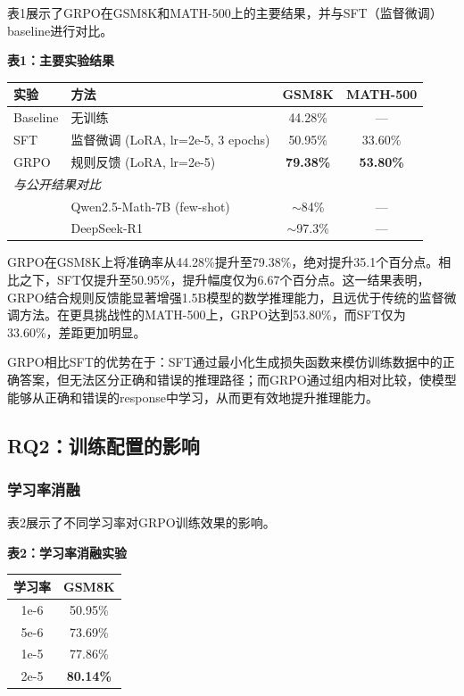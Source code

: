 \documentclass[10.5pt]{article}
\begin{document}
表1展示了GRPO在GSM8K和MATH-500上的主要结果，并与SFT（监督微调）baseline进行对比。

\begin{center}
\textbf{表1：主要实验结果}
\end{center}

\begin{center}
\begin{tabular}{llcc}
\hline
\textbf{实验} & \textbf{方法} & \textbf{GSM8K} & \textbf{MATH-500} \\
\hline
Baseline & 无训练 & 44.28\% & --- \\
SFT & 监督微调 (LoRA, lr=2e-5, 3 epochs) & 50.95\% & 33.60\% \\
GRPO & 规则反馈 (LoRA, lr=2e-5) & \textbf{79.38\%} & \textbf{53.80\%} \\
\hline
\multicolumn{4}{l}{\textit{与公开结果对比}} \\
\hline
\cite{qwen25math} & Qwen2.5-Math-7B (few-shot) & $\sim$84\% & --- \\
\cite{deepseekr1} & DeepSeek-R1 & $\sim$97.3\% & --- \\
\hline
\end{tabular}
\end{center}

GRPO在GSM8K上将准确率从44.28\%提升至79.38\%，绝对提升35.1个百分点。相比之下，SFT仅提升至50.95\%，提升幅度仅为6.67个百分点。这一结果表明，GRPO结合规则反馈能显著增强1.5B模型的数学推理能力，且远优于传统的监督微调方法。在更具挑战性的MATH-500上，GRPO达到53.80\%，而SFT仅为33.60\%，差距更加明显。

GRPO相比SFT的优势在于：SFT通过最小化生成损失函数来模仿训练数据中的正确答案，但无法区分正确和错误的推理路径；而GRPO通过组内相对比较，使模型能够从正确和错误的response中学习，从而更有效地提升推理能力。

\subsection{RQ2：训练配置的影响}

\subsubsection{学习率消融}

表2展示了不同学习率对GRPO训练效果的影响。

\begin{center}
\textbf{表2：学习率消融实验}
\end{center}

\begin{center}
\begin{tabular}{cc}
\hline
\textbf{学习率} & \textbf{GSM8K} \\
\hline
1e-6 & 50.95\% \\
5e-6 & 73.69\% \\
1e-5 & 77.86\% \\
2e-5 & \textbf{80.14\%} \\
\hline
\end{tabular}
\end{center}
\end{document}
